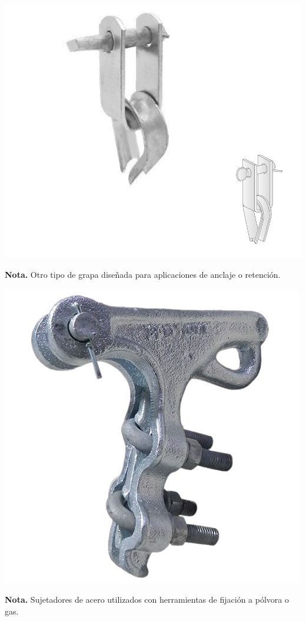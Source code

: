 \vspace{1cm}

\noindent
\begin{minipage}[t]{0.48\textwidth}
    \centering
    \includegraphics[width=\linewidth]{fotosherrajes/grapa_de_retencion.png}
    \footnotesize
    \raggedright
    \textbf{Nota.} Otro tipo de grapa diseñada para aplicaciones de anclaje o retención.
\end{minipage}%
\hfill
\begin{minipage}[t]{0.48\textwidth}
    \centering
    \includegraphics[width=\linewidth]{fotosherrajes/grapas pistola acero.png}
    \footnotesize
    \raggedright
    \textbf{Nota.} Sujetadores de acero utilizados con herramientas de fijación a pólvora o gas.
\end{minipage}

